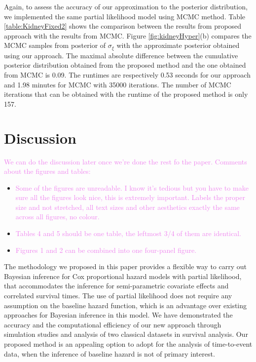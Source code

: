 \documentclass[ba]{imsart}
\newcommand{\alex}[1]{\textcolor{violet}{{ }#1}}
\begin{document}
Again, to assess the accuracy of our approximation to the posterior distribution, we implemented the same partial likelihood model using MCMC method. Table \ref{table:KidneyFixed2} shows the comparison between the results from proposed approach with the results from MCMC. Figure \ref{fig:kidneyHyper}(b) compares the MCMC samples from posterior of $\sigma_{\xi}$ with the approximate posterior obtained using our approach. The maximal absolute difference between the cumulative posterior distribution obtained from the proposed method and the one obtained from MCMC is 0.09. The runtimes are respectively 0.53 seconds for our approach and 1.98 minutes for MCMC with 35000 iterations. The number of MCMC iterations that can be obtained with the runtime of the proposed method is only 157.

\section{Discussion}\label{sec:discussion}

\alex{We can do the discussion later once we're done the rest fo the paper. Comments about the figures and tables:}

\begin{itemize}
	\item \alex{Some of the figures are unreadable. I know it's tedious but you have to make sure all the figures look nice, this is extremely important. Labels the proper size and not stretched, all text sizes and other aesthetics exactly the same across all figures, no colour.}
	\item \alex{Tables 4 and 5 should be one table, the leftmost 3/4 of them are identical.}
	\item \alex{Figures 1 and 2 can be combined into one four-panel figure.}
\end{itemize}

The methodology we proposed in this paper provides a flexible way to carry out Bayesian inference for Cox proportional hazard models with partial likelihood, that accommodates the inference for semi-parametric covariate effects and correlated survival times. The use of partial likelihood does not require any assumption on the baseline hazard function, which is an advantage over existing approaches for Bayesian inference in this model. We have demonstrated the accuracy and the computational efficiency of our new approach through simulation studies and analysis of two classical datasets in survival analysis. Our proposed method is an appealing option to adopt for the analysis of time-to-event data, when the inference of baseline hazard is not of primary interest.
\end{document}
